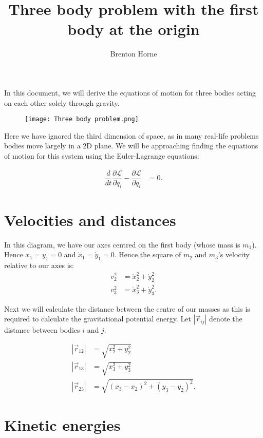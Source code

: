 \documentclass[12pt,a4paper,portrait]{article}
\date{}
\title{Three body problem with the first body at the origin}
\author{Brenton Horne}
\begin{document}
	\maketitle
	
	In this document, we will derive the equations of motion for three bodies acting on each other solely through gravity. 
	\begin{figure}[H]
		\texttt{[image: Three body problem.png]}
	\end{figure}
	
	Here we have ignored the third dimension of space, as in many real-life problems bodies move largely in a 2D plane. We will be approaching finding the equations of motion for this system using the Euler-Lagrange equations:
	
	\begin{align}
		\dfrac{d}{dt}\dfrac{\partial \mathcal{L}}{\partial \dot{q}_i} - \dfrac{\partial \mathcal{L}}{\partial q_i} &= 0.\label{ELE}
	\end{align} 
	
	\tableofcontents
	
	\section{Velocities and distances}
	In this diagram, we have our axes centred on the first body (whose mass is $m_1$). Hence $x_1=y_1 = 0$ and $\dot{x}_1 = \dot{y}_1 = 0$. Hence the square of $m_2$ and $m_3$'s velocity relative to our axes is: 
	\begin{align*}
		v_2^2 &= \dot{x}_2^2 + \dot{y}_2^2 \\
		v_3^2 &= \dot{x}_3^2 + \dot{y}_3^2.
	\end{align*}
	
	Next we will calculate the distance between the centre of our masses as this is required to calculate the gravitational potential energy. Let $|\vec{r}_{ij}|$ denote the distance between bodies $i$ and $j$. 
	
	\begin{align*}
		\left|\vec{r}_{12}\right| &= \sqrt{x_2^2+y_2^2} \\
		\left|\vec{r}_{13}\right| &= \sqrt{x_3^2+y_3^2} \\
		\left|\vec{r}_{23}\right| &= \sqrt{(x_3-x_2)^2+(y_3-y_2)^2}.
	\end{align*}
	
	\section{Kinetic energies}
	
\end{document}
